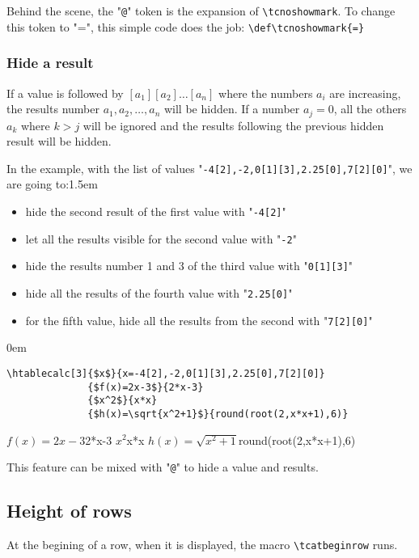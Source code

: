 \documentclass[a4paper,10pt]{article}
\newcommand\verbinline{\lstinline[breaklines=false,basicstyle=\normalsize\ttfamily]}
\newcommand\mywidth{0.85\linewidth}
\begin{document}
Behind the scene, the "\verb|@|" token is the expansion of \verbinline|\tcnoshowmark|. To change this token to "=", this simple code does the job: \verbinline|\def\tcnoshowmark{=}|

\subsubsection{Hide a result}
If a value is followed by $[a_1][a_2]\ldots[a_n]$ where the numbers $a_i$ are increasing, the results number $a_1,a_2,\ldots,a_n$ will be hidden. If a number $a_j=0$, all the others $a_k$ where $k>j$ will be ignored and the results following the previous hidden result will be hidden.\medskip

In the example, with the list of values "\verb|-4[2],-2,0[1][3],2.25[0],7[2][0]|", we are going to:\parindent1.5em
\begin{itemize}
	\item hide the second result of the first value with "\verb|-4[2]|"
	\item let all the results visible for the second value with "\verb|-2|"
	\item hide the results number 1 and 3 of the third value with "\verb|0[1][3]|"
	\item hide all the results of the fourth value with "\verb|2.25[0]|"
	\item for the fifth value, hide all the results from the second with "\verb|7[2][0]|"
\end{itemize}\parindent0em

\begin{center}
\begin{minipage}{\mywidth}
\begin{lstlisting}
\htablecalc[3]{$x$}{x=-4[2],-2,0[1][3],2.25[0],7[2][0]}
              {$f(x)=2x-3$}{2*x-3}
              {$x^2$}{x*x}
              {$h(x)=\sqrt{x^2+1}$}{round(root(2,x*x+1),6)}
\end{lstlisting}
\end{minipage}

              {$f(x)=2x-3$}{2*x-3}
              {$x^2$}{x*x}
              {$h(x)=\sqrt{x^2+1}$}{round(root(2,x*x+1),6)}
\end{center}
This feature can be mixed with "\verb|@|" to hide a value and results.

\subsection{Height of rows}
At the begining of a row, when it is displayed, the macro \verbinline|\tcatbeginrow| runs.
\end{document}
